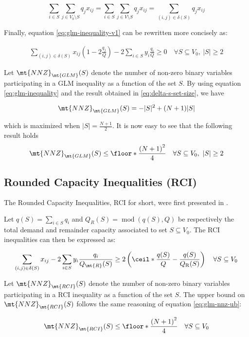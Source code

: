 \begin{equation}
	\sum_{i \in S} \sum_{j \in V_0 \setminus S} q_j  x_{ij} = \sum_{i \in S} \sum_{j \in V \setminus S} q_j  x_{ij} = \sum_{(i, j) \in \delta(S)} q_j x_{ij}
\end{equation}

Finally, equation \eqref{eq:glm-inequality-v1} can be rewritten more concisely as:

\begin{equation}\label{eq:glm-inequality}
	\begin{split}
		\sum_{(i, j) \in \delta(S)} x_{ij} \left( 1 - 2 \frac{q_j}{Q} \right)  -2 \sum_{i \in S} y_i \frac{q_i}{Q}  \ge  0   \quad \forall S \subseteq V_0,\ |S| \ge 2
	\end{split}
\end{equation}


Let $\mt{NNZ}_{\mt{GLM}}(S)$ denote the number of non-zero binary variables participating in a GLM inequality as a function of the set $S$.
By using equation \eqref{eq:glm-inequality} and the result obtained in \eqref{eq:delta-s-set-size}, we have

\begin{equation}
	\mt{NNZ}_{\mt{GLM}}(S) = -|S|^2 + (N + 1)|S|
\end{equation}

which is maximized when $|S| = \frac{N+1}{2}$.
It is now easy to see that the following result holds
\begin{equation}\label{eq:glm-nnz-ub}
	\mt{NNZ}_{\mt{GLM}}(S) \le \floor*{ \frac{\left( N + 1 \right)^2}{4}} \quad \forall S \subseteq V_0,\ |S| \ge 2
\end{equation}


\subsection{Rounded Capacity Inequalities (RCI)}
The Rounded Capacity Inequalities, RCI for short, were first presented in \cite{achuthan_capacitated_1998}.

Let $q(S) = \sum_{i \in S} q_i$ and $Q_{R}(S) = \mathop{mod}\left(q(S), Q \right)$ be respectively the total demand and remainder capacity associated to set $S \subseteq V_0$.
The RCI inequalities can then be expressed as:

\begin{equation}\label{eq:rci-inequality}
	\begin{split}
		\sum_{(i, j) \in \delta(S)} x_{ij} -2 \sum_{i \in S} y_i {\frac{q_i}{Q_\mt{R}(S)}}    \ge   2 \left( \ceil*{ \frac{q(S)}{Q}} - \frac{q(S)}{Q_{\mathrm{R}}(S)} \right) \quad \forall S \subseteq V_0
	\end{split}
\end{equation}

Let $\mt{NNZ}_{\mt{RCI}}(S)$ denote the number of non-zero binary variables participating in a RCI inequality as a function of the set $S$.
The upper bound on $\mt{NNZ}_{\mt{RCI}}(S)$ follows the same reasoning of equation \eqref{eq:glm-nnz-ub}:

\begin{equation}\label{eq:rc-nnz-ub}
	\mt{NNZ}_{\mt{RCI}}(S) \le \floor*{\frac{\left( N + 1\right)^2}{4}} \quad \forall S \subseteq V_0
\end{equation}
